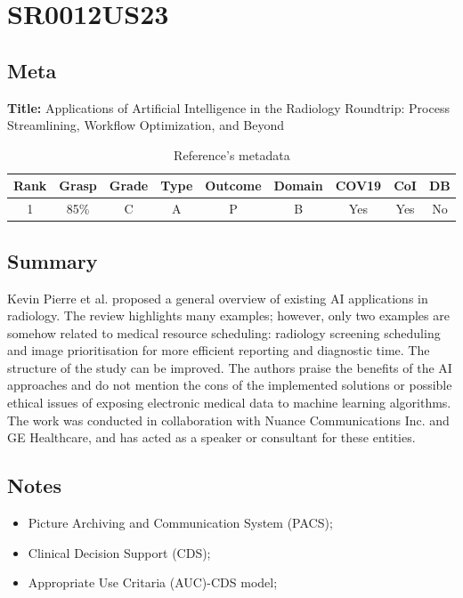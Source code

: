 \section{ SR0012US23 }


\subsection{Meta}

    \textbf{Title:}
    Applications of Artificial Intelligence in the Radiology Roundtrip: Process Streamlining, Workflow Optimization, and Beyond

    \begin{table}[H]
        \centering
        \begin{tabular}{|c|c|c|c|c|c|c|c|c|}
            \hline
                \textbf{Rank} & \textbf{Grasp} & \textbf{Grade} & \textbf{Type} & \textbf{Outcome} & \textbf{Domain} & \textbf{COV19} & \textbf{CoI} & \textbf{DB} \\
            \hline
                1 & 85\% & C & A & P & B & Yes & Yes & No \\
            \hline
        \end{tabular}
        \caption{Reference's metadata}
        \label{tab:SR0012US23}
    \end{table}

\subsection{Summary}
    Kevin Pierre et al. \cite{x076} proposed a general overview of existing AI applications in radiology. The review highlights many examples; however, only two examples are somehow related to medical resource scheduling: radiology screening scheduling and image prioritisation for more efficient reporting and diagnostic time. The structure of the study can be improved. The authors praise the benefits of the AI approaches and do not mention the cons of the implemented solutions or possible ethical issues of exposing electronic medical data to machine learning algorithms. The work was conducted in collaboration with Nuance Communications Inc. and GE Healthcare, and has acted as a speaker or consultant for these entities.

\subsection{Notes}
    \begin{itemize}
        \item Picture Archiving and Communication System (PACS);
        \item Clinical Decision Support (CDS);
        \item Appropriate Use Critaria (AUC)-CDS model;
    \end{itemize}



